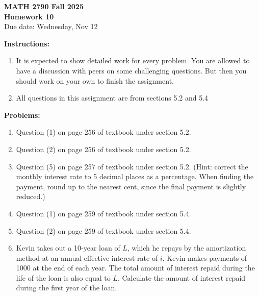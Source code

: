 \documentclass[12pt]{article}
\begin{document}
\begin{center}
\textbf{\Large MATH 2790 Fall 2025}\\[1em]
\textbf{\Large Homework 10}\\[0.5em]
Due date: Wednesday, Nov 12
\end{center}

\bigskip

\textbf{Instructions:}

\begin{enumerate}[label=(\alph*)]
\item It is expected to show detailed work for every problem. You are allowed to have a
discussion with peers on some challenging questions. But then you should work on
your own to finish the assignment.

\item All questions in this assignment are from sections 5.2 and 5.4
\end{enumerate}

\bigskip

\textbf{Problems:}

\begin{enumerate}
\item Question (1) on page 256 of textbook under section 5.2.

\item Question (2) on page 256 of textbook under section 5.2.

\item Question (5) on page 257 of textbook under section 5.2. (Hint: correct the monthly
interest rate to 5 decimal places as a percentage. When finding the payment, round
up to the nearest cent, since the final payment is slightly reduced.)

\item Question (1) on page 259 of textbook under section 5.4.

\item Question (2) on page 259 of textbook under section 5.4.

\item Kevin takes out a 10-year loan of $L$, which he repays by the amortization method
at an annual effective interest rate of $i$. Kevin makes payments of 1000 at the end of
each year. The total amount of interest repaid during the life of the loan is also equal
to $L$. Calculate the amount of interest repaid during the first year of the loan.
\end{enumerate}
\end{document}
